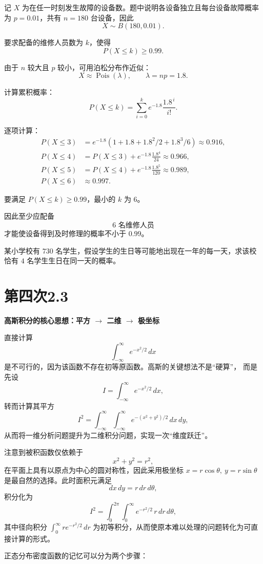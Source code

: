 \begin{solution}
记 $X$ 为在任一时刻发生故障的设备数。题中说明各设备独立且每台设备故障概率为 $p=0.01$，共有 $n=180$ 台设备，因此
\[
X\sim B(180,0.01).
\]

要求配备的维修人员数为 $k$，使得
\[
P(X\le k)\ge 0.99.
\]

由于 $n$ 较大且 $p$ 较小，可用泊松分布作近似：
\[
X \approx \operatorname{Pois}(\lambda),\qquad \lambda=np=1.8.
\]

计算累积概率：
\[
P(X\le k)=\sum_{i=0}^{k}e^{-1.8}\frac{1.8^{\,i}}{i!}.
\]

逐项计算：
\[
\begin{aligned}
P(X\le 3)&=e^{-1.8}(1+1.8+1.8^2/2+1.8^3/6)\approx 0.916,\\[2mm]
P(X\le 4)&=P(X\le3)+e^{-1.8}\frac{1.8^4}{24}\approx 0.966,\\[2mm]
P(X\le 5)&=P(X\le4)+e^{-1.8}\frac{1.8^5}{120}\approx 0.989,\\[2mm]
P(X\le 6)&\approx 0.997.
\end{aligned}
\]

要满足 $P(X\le k)\ge 0.99$，最小的 $k$ 为 $6$。

因此至少应配备
\[
\boxed{6\text{ 名维修人员}}
\]
才能使设备得到及时修理的概率不小于 $0.99$。
\end{solution}
\begin{homework}[2.13]
某小学校有 $730$ 名学生，假设学生的生日等可能地出现在一年的每一天，求该校恰有 $4$ 名学生生日在同一天的概率。
\end{homework}
\section{第四次2.3}
\begin{dxtips}
\textbf{高斯积分的核心思想：平方 $\to$ 二维 $\to$ 极坐标}

直接计算
\[
\int_{-\infty}^{\infty} e^{-x^2/2}\,dx
\]
是不可行的，因为该函数不存在初等原函数。高斯的关键想法不是“硬算”，
而是先设
\[
I=\int_{-\infty}^{\infty} e^{-x^2/2}\,dx,
\]
转而计算其平方
\[
I^2
=
\int_{-\infty}^{\infty}\int_{-\infty}^{\infty}
e^{-(x^2+y^2)/2}\,dx\,dy,
\]
从而将一维分析问题提升为二维积分问题，实现一次“维度跃迁”。

注意到被积函数仅依赖于
\[
x^2+y^2=r^2,
\]
在平面上具有以原点为中心的圆对称性，因此采用极坐标
\(
x=r\cos\theta,\ y=r\sin\theta
\)
是最自然的选择。此时面积元满足
\[
dx\,dy=r\,dr\,d\theta,
\]
积分化为
\[
I^2=\int_0^{2\pi}\int_0^{\infty} e^{-r^2/2}\,r\,dr\,d\theta,
\]
其中径向积分
\(
\int_0^{\infty} r e^{-r^2/2}\,dr
\)
为初等积分，从而使原本难以处理的问题转化为可直接计算的形式。
\end{dxtips}
正态分布密度函数的记忆可以分为两个步骤：

